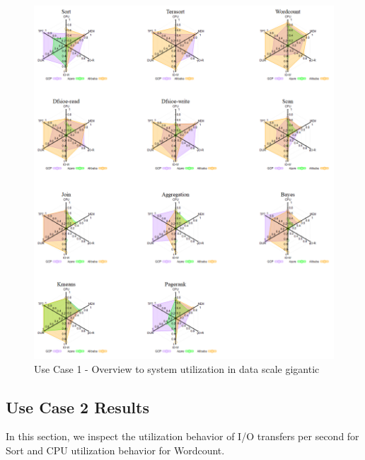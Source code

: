 \documentclass[review]{elsarticle}
\begin{document}
\begin{figure}[p]
	\caption{Use Case 1 - Overview to system utilization in data scale gigantic}
	\label{fig:uc1-gigantic-new}
	\includegraphics[width=\textwidth]{uc1-gigantic-new}
	\centering
\end{figure}


\subsection{Use Case 2 Results}
In this section, we inspect the utilization behavior of I/O transfers per second for Sort and CPU utilization behavior for Wordcount.
\end{document}
